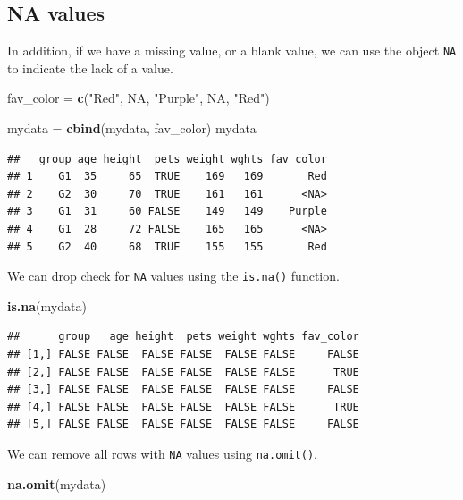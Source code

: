 \documentclass[
]{book}
\newenvironment{Shaded}{\begin{snugshade}}{\end{snugshade}}
\newcommand{\KeywordTok}[1]{\textcolor[rgb]{0.13,0.29,0.53}{\textbf{#1}}}
\newcommand{\NormalTok}[1]{#1}
\newcommand{\OtherTok}[1]{\textcolor[rgb]{0.56,0.35,0.01}{#1}}
\newcommand{\StringTok}[1]{\textcolor[rgb]{0.31,0.60,0.02}{#1}}
\begin{document}
\hypertarget{na-values}{%
\subsection*{NA values}\label{na-values}}

In addition, if we have a missing value, or a blank value, we can use the object \texttt{NA} to indicate the lack of a value.

\begin{Shaded}
\begin{Highlighting}[]
\NormalTok{fav_color =}\StringTok{ }\KeywordTok{c}\NormalTok{(}\StringTok{"Red"}\NormalTok{, }\OtherTok{NA}\NormalTok{, }\StringTok{"Purple"}\NormalTok{, }\OtherTok{NA}\NormalTok{, }\StringTok{"Red"}\NormalTok{)}

\NormalTok{mydata =}\StringTok{ }\KeywordTok{cbind}\NormalTok{(mydata, fav_color)}
\NormalTok{mydata}
\end{Highlighting}
\end{Shaded}

\begin{verbatim}
##   group age height  pets weight wghts fav_color
## 1    G1  35     65  TRUE    169   169       Red
## 2    G2  30     70  TRUE    161   161      <NA>
## 3    G1  31     60 FALSE    149   149    Purple
## 4    G1  28     72 FALSE    165   165      <NA>
## 5    G2  40     68  TRUE    155   155       Red
\end{verbatim}

We can drop check for \texttt{NA} values using the \texttt{is.na()} function.

\begin{Shaded}
\begin{Highlighting}[]
\KeywordTok{is.na}\NormalTok{(mydata)}
\end{Highlighting}
\end{Shaded}

\begin{verbatim}
##      group   age height  pets weight wghts fav_color
## [1,] FALSE FALSE  FALSE FALSE  FALSE FALSE     FALSE
## [2,] FALSE FALSE  FALSE FALSE  FALSE FALSE      TRUE
## [3,] FALSE FALSE  FALSE FALSE  FALSE FALSE     FALSE
## [4,] FALSE FALSE  FALSE FALSE  FALSE FALSE      TRUE
## [5,] FALSE FALSE  FALSE FALSE  FALSE FALSE     FALSE
\end{verbatim}

We can remove all rows with \texttt{NA} values using \texttt{na.omit()}.

\begin{Shaded}
\begin{Highlighting}[]
\KeywordTok{na.omit}\NormalTok{(mydata)}
\end{Highlighting}
\end{Shaded}
\end{document}
